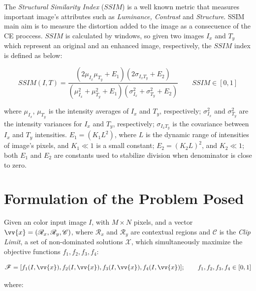 \documentclass[11pt]{article}
\begin{document}
The \textit{Structural Similarity Index} ($SSIM$) \cite{wang2004image} is a well known metric that measures important image's attributes such as \textit{Luminance, Contrast} and \textit{Structure}. SSIM main aim is to measure the distortion added to the image as a consecuence of the CE proccess. $SSIM$ is calculated by windows, so given two images $I_x$ and $T_y$ which represent an original and an enhanced image, respectively, the $SSIM$ index is defined as below:

\begin{equation}
SSIM(I,T) = \frac{(2\mu_{I_x} \mu_{T_y}+E_1)(2\sigma_{I_xT_y}+E_2)}{(\mu^2_{I_x}+\mu^2_{T_y}+E_1)(\sigma^2_{I_x} + \sigma^2_{T_y}+E_2)} \qquad SSIM \in [0,1]
\end{equation}

where $\mu_{I_x}$, $\mu_{T_y}$ is the intensity averages of $I_x$ and $T_y$, respectively; $\sigma^2_{I_x}$ and  $\sigma^2_{T_y}$ are the intensity variances for $I_x$ and $T_y$, respectively; $\sigma_{I_xT_y}$ is the covariance between $I_x$ and $T_y$ intensities. $E_1=(K_1L^2)$, where $L$ is the dynamic range of intensities of image's pixels, and $K_1 \ll 1$ is a small constant; $E_2=(K_2L)^2$, and $K_2 \ll 1$; both $E_1$ and $E_2$ are constants used to stabilize division when denominator is close to zero.

\section{Formulation of the Problem Posed}\label{sec:formulation}

Given an color input image $I$, with $M \times N$ pixels, and a vector $\vv{x}=(\mathscr{R}_x,\mathscr{R}_y,\mathscr{C})$, where $\mathscr{R}_x$ and $\mathscr{R}_y$ are contextual regions and $\mathscr{C}$ is the \textit{Clip Limit}, a set of non-dominated solutions $\mathscr{X}$, which simultaneously maximize the objective functions $f_1,f_2,f_3,f_4$:

\begin{equation}
\mathscr{F} = [f_1(I,\vv{x}),f_2(I,\vv{x}),f_3(I,\vv{x}),f_4(I,\vv{x})]; \qquad f_1,f_2,f_3,f_4 \in [0,1]
\end{equation}

where:
\end{document}
